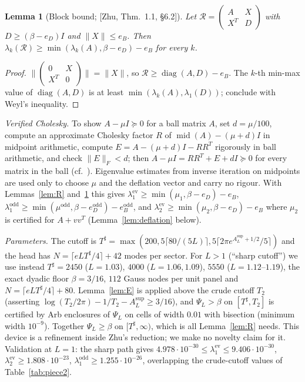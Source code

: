 \documentclass[11pt]{amsart}
\newcommand{\ev}{\mathrm{ev}}
\newcommand{\od}{\mathrm{odd}}
\newcommand{\Tsh}{T^{\sharp}}
\newcommand{\e}[1]{\cdot 10^{#1}}
\newtheorem{lemma}[theorem]{Lemma}
\theoremstyle{definition}
\theoremstyle{remark}
\numberwithin{equation}{section}
\begin{document}
\begin{lemma}[Block bound; {[Zhu, Thm.~1.1, \S6.2]}]\label{lem:S}
Let $\mathcal R=\begin{pmatrix}A&X\\X^T&D\end{pmatrix}$ with $D\ge(\beta-e_D)I$ and $\|X\|\le e_B$. Then $\lambda_k(\mathcal R)\ge\min(\lambda_k(A),\beta-e_D)-e_B$ for every $k$.
\end{lemma}
\begin{proof}
$\bigl\|\begin{pmatrix}0&X\\X^T&0\end{pmatrix}\bigr\|=\|X\|$, so $\mathcal R\ge\operatorname{diag}(A,D)-e_B$. The $k$-th min-max value of $\operatorname{diag}(A,D)$ is at least $\min(\lambda_k(A),\lambda_1(D))$; conclude with Weyl's inequality.
\end{proof}

\emph{Verified Cholesky.} To show $A-\mu I\succeq0$ for a ball matrix $A$, set $d=\mu/100$, compute an approximate Cholesky factor $R$ of $\operatorname{mid}(A)-(\mu+d)I$ in midpoint arithmetic, compute $E=A-(\mu+d)I-RR^T$ rigorously in ball arithmetic, and check $\|E\|_F<d$; then $A-\mu I=RR^T+E+dI\succeq0$ for every matrix in the ball (cf.~\cite{Rump}). Eigenvalue estimates from inverse iteration on midpoints are used only to choose $\mu$ and the deflation vector and carry no rigour. With Lemmas~\ref{lem:R} and~\ref{lem:S} this gives $\lambda_1^\ev\ge\min(\mu_1,\beta-e_D)-e_B$, $\lambda_1^\od\ge\min(\mu^\od,\beta-e_D^\od)-e_B^\od$, and $\lambda_2^\ev\ge\min(\mu_2,\beta-e_D)-e_B$ where $\mu_2$ is certified for $A+vv^T$ (Lemma~\ref{lem:deflation} below).

\emph{Parameters.} The cutoff is $\Tsh=\max(200,5\lceil80/(5L)\rceil,5\lceil2\pi e^{A_L^{\sup}+1/2}/5\rceil)$ and the head has $N=\lceil eL\Tsh/4\rceil+42$ modes per sector. For $L>1$ (``sharp cutoff'') we use instead $\Tsh=2450$ ($L=1.03$), $4000$ ($L=1.06,1.09$), $5550$ ($L=1.12$--$1.19$), the exact dyadic floor $\beta=3/16$, $112$ Gauss nodes per unit panel and $N=\lceil eL\Tsh/4\rceil+80$. Lemma~\ref{lem:E} is applied above the crude cutoff $T_2$ (asserting $\log(T_2/2\pi)-1/T_2-A_L^{\sup}\ge3/16$), and $\Psi_L>\beta$ on $[\Tsh,T_2]$ is certified by Arb enclosures of $\Psi_L$ on cells of width $0.01$ with bisection (minimum width $10^{-9}$). Together $\Psi_L\ge\beta$ on $[\Tsh,\infty)$, which is all Lemma~\ref{lem:R} needs. This device is a refinement inside Zhu's reduction; we make no novelty claim for it. Validation at $L=1$: the sharp path gives $4.978\e{-30}\le\lambda_1^\ev\le9.406\e{-30}$, $\lambda_2^\ev\ge1.808\e{-23}$, $\lambda_1^\od\ge1.255\e{-26}$, overlapping the crude-cutoff values of Table~\ref{tab:piece2}.
\end{document}
